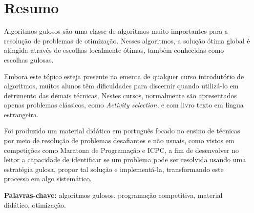 \chapter*{Resumo}
\label{resumo}

Algoritmos gulosos são uma classe de algoritmos muito importantes para a resolução de problemas de otimização. Nesses algoritmos, a solução ótima global é atingida através de escolhas localmente ótimas, também conhecidas como escolhas gulosas.

Embora este tópico esteja presente na ementa de qualquer curso introdutório de algoritmos, muitos alunos têm dificuldades para discernir quando utilizá-lo em detrimento das demais técnicas. Nestes cursos, normalmente são apresentados apenas problemas clássicos, como \emph{Activity selection}, e com livro texto em língua estrangeira.

Foi produzido um material didático em português focado no ensino de técnicas por meio de resolução de problemas desafiantes e não usuais, como vistos em competições como Maratona de Programação e ICPC, a fim de desenvolver no leitor a capacidade de identificar se um problema pode ser resolvida usando uma estratégia gulosa, propor tal solução e implementá-la, transformando este processo em algo sistemático.


\textbf{Palavras-chave:} algoritmos gulosos, programação competitiva, material didático, otimização.
